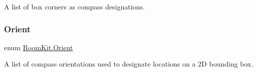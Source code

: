 A list of box corners as compass designations. 

\mbox{\label{namespace_room_kit_a46927f752f7751de2c23e9e644fb508d}} 
\subsubsection{\texorpdfstring{Orient}{Orient}}
{\footnotesize\ttfamily enum \mbox{\hyperlink{namespace_room_kit_a46927f752f7751de2c23e9e644fb508d}{Room\+Kit.\+Orient}}\hspace{0.3cm}{\ttfamily [strong]}}



A list of compass orientations used to designate locations on a 2D bounding box. 

